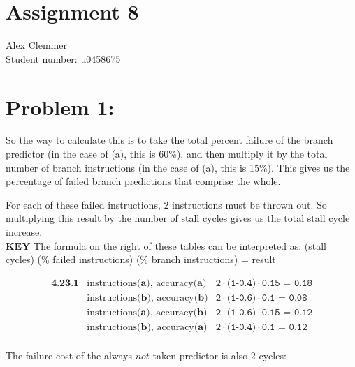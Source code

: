 \documentclass[a4paper]{article}
\begin{document}
\section*{Assignment 8}
Alex Clemmer\\
Student number: u0458675

\section*{Problem 1:}

So the way to calculate this is to take the total percent failure of the branch predictor (in the case of (a), this is 60\%), and then multiply it by the total number of branch instructions (in the case of (a), this is 15\%). This gives us the percentage of failed branch predictions that comprise the whole.

For each of these failed instructions, 2 instructions must be thrown out. So multiplying this result by the number of stall cycles gives us the total stall cycle increase. \\

$\textbf{KEY}$ The formula on the right of these tables can be interpreted as: (stall cycles) (\% failed instructions) (\% branch instructions) = result

\begin{equation}
\begin{array}{rll}
\textbf{4.23.1} & \mbox{instructions} \textbf{(a)} \mbox{, accuracy} \textbf{(a)} & \texttt{2} \cdot \texttt{(1-0.4)} \cdot \texttt{0.15 = 0.18} \\[.05in]
&  \mbox{instructions} \textbf{(b)} \mbox{, accuracy} \textbf{(b)} & \texttt{2} \cdot \texttt{(1-0.6)} \cdot \texttt{0.1 = 0.08} \\[.05in]
&  \mbox{instructions} \textbf{(a)} \mbox{, accuracy} \textbf{(b)} & \texttt{2} \cdot \texttt{(1-0.6)} \cdot \texttt{0.15 = 0.12} \\[.05in]
&  \mbox{instructions} \textbf{(b)} \mbox{, accuracy} \textbf{(a)} & \texttt{2} \cdot \texttt{(1-0.4)} \cdot \texttt{0.1 = 0.12} \\[.05in]
\end{array}
\end{equation}

The failure cost of the always-$\textit{not}$-taken predictor is also 2 cycles:
\end{document}
